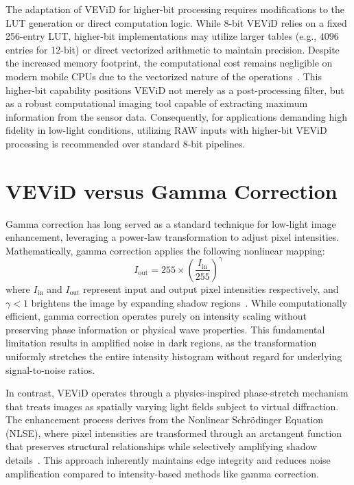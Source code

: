 \documentclass[journal,transmag]{IEEEtran}
\begin{document}
The adaptation of VEViD for higher-bit processing requires modifications to the LUT generation or direct computation logic. While 8-bit VEViD relies on a fixed 256-entry LUT, higher-bit implementations may utilize larger tables (e.g., $4096$ entries for 12-bit) or direct vectorized arithmetic to maintain precision. Despite the increased memory footprint, the computational cost remains negligible on modern mobile CPUs due to the vectorized nature of the operations~\cite{bradski2008opencv}. This higher-bit capability positions VEViD not merely as a post-processing filter, but as a robust computational imaging tool capable of extracting maximum information from the sensor data. Consequently, for applications demanding high fidelity in low-light conditions, utilizing RAW inputs with higher-bit VEViD processing is recommended over standard 8-bit pipelines.

\section{VEViD versus Gamma Correction}
Gamma correction has long served as a standard technique for low-light image enhancement, leveraging a power-law transformation to adjust pixel intensities. Mathematically, gamma correction applies the following nonlinear mapping:
\begin{equation}
    I_{\text{out}} = 255 \times \left( \frac{I_{\text{in}}}{255} \right)^{\gamma}
\end{equation}
where $I_{\text{in}}$ and $I_{\text{out}}$ represent input and output pixel intensities respectively, and $\gamma < 1$ brightens the image by expanding shadow regions~\cite{gonzalez2018digital}. While computationally efficient, gamma correction operates purely on intensity scaling without preserving phase information or physical wave properties. This fundamental limitation results in amplified noise in dark regions, as the transformation uniformly stretches the entire intensity histogram without regard for underlying signal-to-noise ratios.

In contrast, VEViD operates through a physics-inspired phase-stretch mechanism that treats images as spatially varying light fields subject to virtual diffraction. The enhancement process derives from the Nonlinear Schrödinger Equation (NLSE), where pixel intensities are transformed through an arctangent function that preserves structural relationships while selectively amplifying shadow details~\cite{jalali2022vevid}. This approach inherently maintains edge integrity and reduces noise amplification compared to intensity-based methods like gamma correction.
\end{document}
